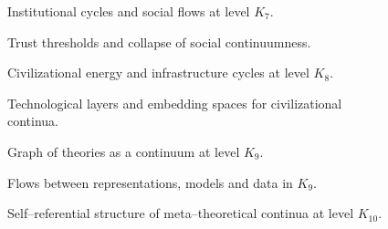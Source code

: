 \begin{figure}[p]
  \centering
  
  \caption{Institutional cycles and social flows at level \texorpdfstring{\(K_7\)}{K_7}.}
  \label{fig:institutional-cycles}
\end{figure}

\begin{figure}[p]
  \centering
  
  \caption{Trust thresholds and collapse of social continuumness.}
  \label{fig:trust-threshold}
\end{figure}

\begin{figure}[p]
  \centering
  
  \caption{Civilizational energy and infrastructure cycles at level \texorpdfstring{\(K_8\)}{K_8}.}
  \label{fig:civilization-energy-cycles}
\end{figure}

\begin{figure}[p]
  \centering
  
  \caption{Technological layers and embedding spaces for civilizational
           continua.}
  \label{fig:technological-layers-m8}
\end{figure}

\begin{figure}[p]
  \centering
  
  \caption{Graph of theories as a continuum at level \texorpdfstring{\(K_9\)}{K_9}.}
  \label{fig:theory-graph}
\end{figure}

\begin{figure}[p]
  \centering
  
  \caption{Flows between representations, models and data in \texorpdfstring{\(K_9\)}{K_9}.}
  \label{fig:representation-flow-graph}
\end{figure}

\begin{figure}[p]
  \centering
  
  \caption{Self--referential structure of meta--theoretical continua at
           level \(K_{10}\).}
  \label{fig:metatheory-k10-selfreference}
\end{figure}
